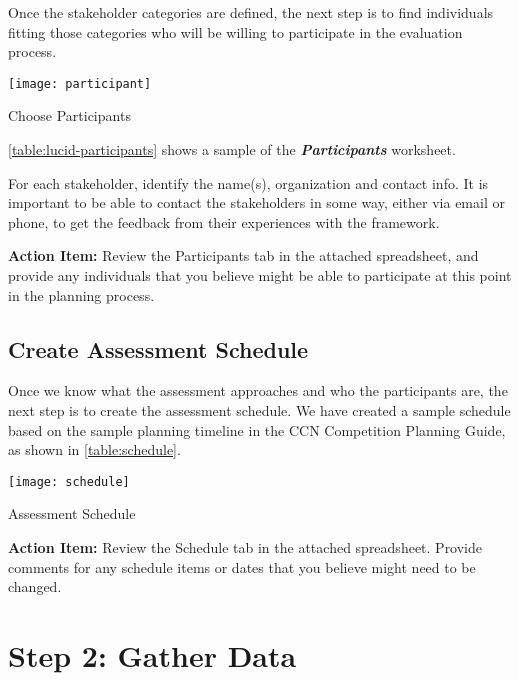 Once the stakeholder categories are defined, the next step is to find
individuals fitting those categories who will be willing to
participate in the evaluation process. 

\begin{table}[ht!]
  \center
  \texttt{[image: participant]}
  \caption{Choose Participants}
  \label{table:lucid-participants}
\end{table}

\autoref{table:lucid-participants} shows a sample of the \textbf{\textit{Participants}} worksheet. 

For each stakeholder, identify the name(s), organization and contact
info. It is important to be able to contact the stakeholders in some
way, either via email or phone, to get the feedback from their
experiences with the framework.

\begin{shadebox}
{\bf Action Item:} Review the Participants tab in the attached
spreadsheet, and provide any individuals that you believe might be
able to participate at this point in the planning process.
\end{shadebox}

\subsection{Create Assessment Schedule}

Once we know what the assessment approaches and who the participants are, the next step is to create the assessment 
schedule. We have created a sample schedule based on the sample
planning timeline in the CCN Competition Planning Guide, as shown in
\autoref{table:schedule}. 

\begin{table}[ht!]
  \center
  \texttt{[image: schedule]}
  \caption{Assessment Schedule}
  \label{table:schedule}
\end{table}

\begin{shadebox}
{\bf Action Item:} Review the Schedule tab in the attached
spreadsheet.  Provide comments for any schedule items or dates that
you believe might need to be changed. 
\end{shadebox}

\section{Step 2: Gather Data}

